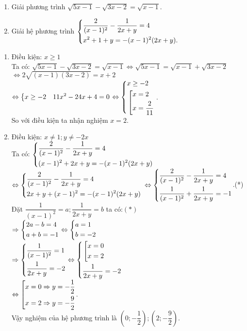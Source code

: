 \begin{ex}%
\hfill 

       \begin{enumerate}
        \item Giải phương trình $\sqrt{5x-1}-\sqrt{3x-2}=\sqrt{x-1}$.
        \item Giải hệ phương trình $\left\{\begin{aligned}
  & \dfrac{2}{(x-1)^2}-\dfrac{1}{2x+y}=4 \\
 & x^2+1+y=-( x-1)^2( 2x+y).\end{aligned}\right.$
    \end{enumerate}
\loigiai
    {
\begin{enumerate}
  \item   Điều kiện: $x\ge 1$\\
  Ta có:
$\sqrt{5x-1}-\sqrt{3x-2}=\sqrt{x-1}\Leftrightarrow \sqrt{5x-1}=\sqrt{x-1}+\sqrt{3x-2}$\\
$\Leftrightarrow 2\sqrt{(x-1)( 3x-2)}=x+2$\\
$\Leftrightarrow \left\{\begin{aligned}&x\ge -2 &11x^2-24x+4=0\end{aligned}\right.\Leftrightarrow \left\{\begin{aligned}&
   x\ge -2\\&\left[\begin{aligned}&x=2\\ &x=\dfrac{2}{11}\end{aligned}\right.\end{aligned}\right.$.\\
So với điều kiện ta nhận nghiệm $x=2$.
 \item Điều kiện: $x\ne 1;y\ne -2x$\\
 Ta có: $\left\{\begin{aligned} & \dfrac{2}{(x-1)^2}-\dfrac{1}{2x+y}=4 \\
 & (x-1)^2+2x+y=-(x-1)^2(2x+y)\end{aligned}\right.$\\
$\Leftrightarrow\left\{\begin{aligned}& \dfrac{2}{(x-1)^2}-\dfrac{1}{2x+y}=4 \\
 & 2x+y+(x-1)^2=-(x-1)^2(2x+y)\end{aligned}\right.\\
 \Leftrightarrow \left\{\begin{aligned}&\dfrac{2}{(x-1)^2}-\dfrac{1}{2x+y}=4 \\
 & \dfrac{1}{( x-1)^2}+\dfrac{1}{2x+y}=-1\end{aligned}\right.$.(*)\\
 Đặt  $\dfrac{1}{(x-1)^2}=a;\dfrac{1}{2x+y}=b$ ta có:$(*)$\\
$\Rightarrow \left\{\begin{aligned}  & 2a-b=4 \\& a+b=-1\end{aligned}\right.
  \Leftrightarrow \left\{\begin{aligned}& a=1 \\& b=-2\end{aligned}\right.$\\
$\Rightarrow \left\{\begin{aligned}& \dfrac{1}{( x-1)^2}=1\\ & \dfrac{1}{2x+y}=-2\end{aligned}\right.\Leftrightarrow \left\{\begin{aligned}
  & \left[\begin{aligned} x=0 \\ x=2\end{aligned}\right.\\
 & \dfrac{1}{2x+y}=-2\end{aligned}\right.$\\
$\Leftrightarrow \left[\begin{aligned}x=0\Rightarrow y=-\dfrac{1}{2}\\
   x=2\Rightarrow y=-\dfrac{9}{2}\end{aligned}\right.$.\\
Vậy nghiệm của hệ phương trình là $\left( 0;-\dfrac{1}{2} \right);\left( 2;-\dfrac{9}{2} \right)$.

 \end{enumerate}
    }
\end{ex}

